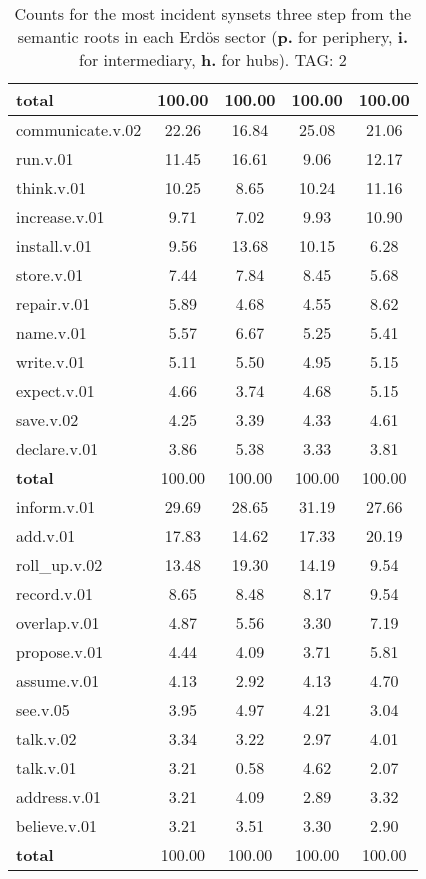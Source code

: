 \begin{table}[h!]
\begin{center}
\begin{tabular}{| l || c | c | c | c |}
{{\bf total}} & 100.00  & 100.00  & 100.00  & 100.00 \\\hline\hline\hline
communicate.v.02 & 22.26  & 16.84  & 25.08  & 21.06 \\\hline
run.v.01 & 11.45  & 16.61  & 9.06  & 12.17 \\\hline
think.v.01 & 10.25  & 8.65  & 10.24  & 11.16 \\\hline
increase.v.01 & 9.71  & 7.02  & 9.93  & 10.90 \\\hline
install.v.01 & 9.56  & 13.68  & 10.15  & 6.28 \\\hline
store.v.01 & 7.44  & 7.84  & 8.45  & 5.68 \\\hline
repair.v.01 & 5.89  & 4.68  & 4.55  & 8.62 \\\hline
name.v.01 & 5.57  & 6.67  & 5.25  & 5.41 \\\hline
write.v.01 & 5.11  & 5.50  & 4.95  & 5.15 \\\hline
expect.v.01 & 4.66  & 3.74  & 4.68  & 5.15 \\\hline
save.v.02 & 4.25  & 3.39  & 4.33  & 4.61 \\\hline
declare.v.01 & 3.86  & 5.38  & 3.33  & 3.81 \\\hline\hline
{{\bf total}} & 100.00  & 100.00  & 100.00  & 100.00 \\\hline\hline\hline
inform.v.01 & 29.69  & 28.65  & 31.19  & 27.66 \\\hline
add.v.01 & 17.83  & 14.62  & 17.33  & 20.19 \\\hline
roll\_up.v.02 & 13.48  & 19.30  & 14.19  & 9.54 \\\hline
record.v.01 & 8.65  & 8.48  & 8.17  & 9.54 \\\hline
overlap.v.01 & 4.87  & 5.56  & 3.30  & 7.19 \\\hline
propose.v.01 & 4.44  & 4.09  & 3.71  & 5.81 \\\hline
assume.v.01 & 4.13  & 2.92  & 4.13  & 4.70 \\\hline
see.v.05 & 3.95  & 4.97  & 4.21  & 3.04 \\\hline
talk.v.02 & 3.34  & 3.22  & 2.97  & 4.01 \\\hline
talk.v.01 & 3.21  & 0.58  & 4.62  & 2.07 \\\hline
address.v.01 & 3.21  & 4.09  & 2.89  & 3.32 \\\hline
believe.v.01 & 3.21  & 3.51  & 3.30  & 2.90 \\\hline\hline
{{\bf total}} & 100.00  & 100.00  & 100.00  & 100.00 \\\hline
\end{tabular}
\caption{Counts for the most incident synsets three step from the semantic roots in each Erd\"os sector ({\bf p.} for periphery, {\bf i.} for intermediary, {\bf h.} for hubs). TAG: 2}
\end{center}
\end{table}
